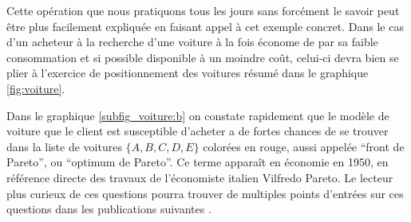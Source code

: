 Cette opération que nous pratiquons tous les jours sans forcément le savoir peut être plus facilement expliquée en faisant appel à cet exemple concret. Dans le cas d'un acheteur à la recherche d'une voiture à la fois économe de par sa faible consommation et si possible disponible à un moindre coût, celui-ci devra bien se plier à l'exercice de positionnement des voitures résumé dans le graphique \ref{fig:voiture}.

Dans le graphique \ref{subfig_voiture:b} on constate rapidement que le modèle de voiture que le client est susceptible d'acheter a de fortes chances de se trouver dans la liste de voitures $\{ A,B,C,D,E \}$ colorées en rouge, aussi appelée \enquote{front de Pareto}, ou \enquote{optimum de Pareto}. Ce terme apparaît en économie en 1950, en référence directe des travaux de l'économiste italien Vilfredo Pareto. Le lecteur plus curieux de ces questions pourra trouver de multiples points d'entrées sur ces questions dans les publications suivantes \autocites{Ehrgott2012, Koksalan2011, Koksalan2013}.


